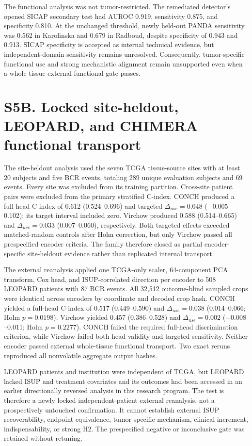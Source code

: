 The functional analysis was not tumor-restricted. The remediated detector's opened SICAP
secondary test had AUROC 0.919, sensitivity 0.875, and specificity 0.810. At the unchanged
threshold, newly held-out PANDA sensitivity was 0.562 in Karolinska and 0.679 in Radboud,
despite specificity of 0.943 and 0.913. SICAP specificity is accepted as internal technical
evidence, but independent-domain sensitivity remains unresolved. Consequently, tumor-specific
functional use and strong mechanistic alignment remain unsupported even when a whole-tissue
external functional gate passes.

\section*{S5B. Locked site-heldout, LEOPARD, and CHIMERA functional transport}

The site-heldout analysis used the seven TCGA tissue-source sites with at least 20 subjects
and five BCR events, totaling 289 unique evaluation subjects and 69 events. Every site was
excluded from its training partition. Cross-site patient pairs were excluded from the primary
stratified C-index. CONCH produced a full-head C-index of 0.612 (0.524--0.696) and targeted
$\Delta_{use}=0.048$ ($-0.005$--0.102); its target interval included zero. Virchow produced
0.588 (0.514--0.665) and $\Delta_{use}=0.033$ (0.007--0.060), respectively. Both targeted
effects exceeded matched-random controls after Holm correction, but only Virchow passed all
prespecified encoder criteria. The family therefore closed as partial encoder-specific
site-heldout evidence rather than replicated internal transport.

The external reanalysis applied one TCGA-only scaler, 64-component PCA transform, Cox head,
and ISUP-correlated direction per encoder to 508 LEOPARD patients with 87 BCR events. All
32,512 outcome-blind sampled crops were identical across encoders by coordinate and decoded
crop hash. CONCH yielded a full-head C-index of 0.517 (0.449--0.590) and
$\Delta_{use}=0.038$ (0.014--0.066; Holm $p=0.0198$). Virchow yielded 0.457
(0.386--0.528) and $\Delta_{use}=0.002$ ($-0.008$--0.011; Holm $p=0.2277$).
CONCH failed the required full-head discrimination criterion, while Virchow failed both head
validity and targeted sensitivity. Neither encoder passed external whole-tissue functional
transport. Two exact reruns reproduced all nonvolatile aggregate output hashes.

LEOPARD patients and institution were independent of TCGA, but LEOPARD lacked ISUP and
treatment covariates and its outcomes had been accessed in an earlier directionally reversed
analysis in this research program. The test is therefore a newly locked independent-patient
external reanalysis, not a prospectively untouched confirmation. It cannot establish external
ISUP recoverability, endpoint equivalence, tumor-specific mechanism, clinical increment,
indispensability, or strong H2. The prespecified negative or inconclusive gate was retained
without retuning.

